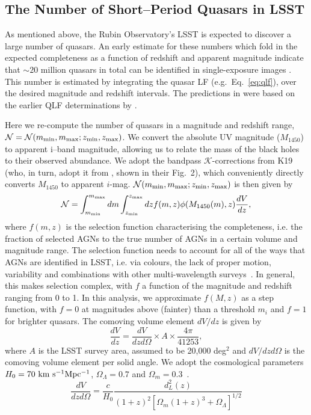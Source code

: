 \documentclass[fleqn,usenatbib]{mnras}
\begin{document}
\subsection{The Number of Short--Period Quasars in LSST} \label{sec:N_tot}
%
As mentioned above, the Rubin Observatory's LSST is expected to discover a large number of quasars. An early estimate for these numbers which fold in the expected completeness as a function of redshift and apparent magnitude indicate that $\sim 20$ million quasars in total can be identified in single-exposure images \citep{LSSTScienceCollaboration2009}.  This number is estimated by integrating the quasar LF (e.g.~Eq.~\ref{eq:qlf}), over the desired magnitude and redshift intervals. The predictions in \citet{LSSTScienceCollaboration2009} were based on the earlier QLF determinations by \citet{Hopkins2007}.

Here we re-compute the number of quasars in a magnitude and redshift range,
$\mathcal{N}=\mathcal{N}(m_{\rm min},m_{\rm max}; z_{\rm min}, z_{\rm max})$. We convert the absolute UV magnitude ($M_{1450}$) to apparent i--band magnitude, allowing us to relate the mass of the black holes to their observed abundance. We adopt the bandpass $\mathcal{K}$-corrections from K19 (who, in turn, adopt it from \citealt{Lusso2015}, shown in their Fig.~2), which conveniently directly converts $M_{1450}$ to apparent $i$-mag. $\mathcal{N}(m_{\rm min},m_{\rm max}; z_{\rm min}, z_{\rm max})$ is then given by
\begin{equation} \label{eq:V_eff}
    \mathcal{N} = \int_{m_{\rm min}}^{m_{\rm max}} dm \int_{z_{\rm min}}^{z_{\rm max}} dz f(m,z)\phi(M_{1450}(m),z) \frac{dV}{dz},
\end{equation}
%
where $f(m,z)$ is the selection function characterising the completeness, i.e. the fraction of selected AGNs to the true number of AGNs in a certain volume and magnitude range. The selection function needs to account for all of the ways that AGNs are identified in LSST, i.e. via colours, the lack of proper motion, variability and combinations with other multi-wavelength surveys~\citep{LSSTScienceCollaboration2009}. In general, this makes selection complex, with $f$ a function of the magnitude and redshift ranging from 0 to 1. In this analysis, we approximate $f(M,z)$ as a step function, with $f=0$ at magnitudes above (fainter) than a threshold $m_i$ and $f=1$ for brighter quasars.
The comoving volume element $dV/dz$ is given by
%
\begin{equation} \label{eq:comov_V}
    \frac{dV}{dz} = \frac{dV}{dzd\Omega}\times A \times \frac{4\pi}{41253},
\end{equation}
%
where $A$ is the LSST survey area, assumed to be 20,000 deg$^2$ and $dV/dzd\Omega$ is the comoving volume element per solid angle.
We adopt the cosmological parameters $H_0=70~{\rm km~s^{-1}Mpc^{-1}}$, $\Omega_{\Lambda}=0.7$ and $\Omega_{m}=0.3$~\citep{Planck2018}.
%
\begin{equation} \label{eq:comov_V_sol}
    \frac{dV}{dzd\Omega} = \frac{c}{H_0}\frac{d^2_{L}(z)}{(1+z)^2[\Omega_m(1+z)^3+\Omega_{\Lambda}]^{1/2}}
\end{equation}
%
\end{document}

